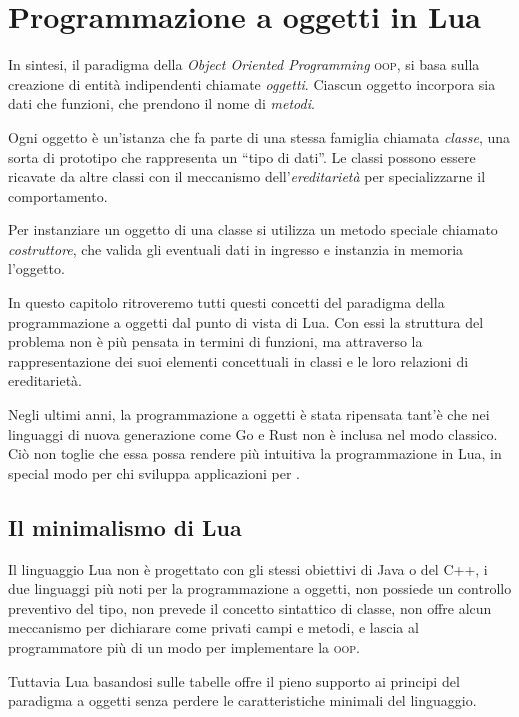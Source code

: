 
\chapter{Programmazione a oggetti in Lua}
\label{iiChOop}

In sintesi, il paradigma della \emph{Object Oriented Programming} \textsc{oop},
si basa sulla creazione di entità indipendenti chiamate \emph{oggetti}. Ciascun
oggetto incorpora sia dati che funzioni, che prendono il nome di \emph{metodi}.

Ogni oggetto è un'istanza che fa parte di una stessa famiglia chiamata
\emph{classe}, una sorta di prototipo che rappresenta un ``tipo di dati''. Le
classi possono essere ricavate da altre classi con il meccanismo
dell'\emph{ereditarietà} per specializzarne il comportamento.

Per instanziare un oggetto di una classe si utilizza un metodo speciale chiamato
\emph{costruttore}, che valida gli eventuali dati in ingresso e instanzia in
memoria l'oggetto.

In questo capitolo ritroveremo tutti questi concetti del paradigma della
programmazione a oggetti dal punto di vista di Lua. Con essi la struttura del
problema non è più pensata in termini di funzioni, ma attraverso la
rappresentazione dei suoi elementi concettuali in classi e le loro relazioni di
ereditarietà.

Negli ultimi anni, la programmazione a oggetti è stata ripensata tant'è che nei
linguaggi di nuova generazione come Go e Rust non è inclusa nel modo classico.
Ciò non toglie che essa possa rendere più intuitiva la programmazione in Lua, in
special modo per chi sviluppa applicazioni per \LuaTeX.


\section{Il minimalismo di Lua}

Il linguaggio Lua non è progettato con gli stessi obiettivi di Java o del C++, i
due linguaggi più noti per la programmazione a oggetti, non possiede un
controllo preventivo del tipo, non prevede il concetto sintattico di classe, non
offre alcun meccanismo per dichiarare come privati campi e metodi, e lascia al
programmatore più di un modo per implementare la \textsc{oop}.

Tuttavia Lua basandosi sulle tabelle offre il pieno supporto ai principi del
paradigma a oggetti senza perdere le caratteristiche minimali del linguaggio.


